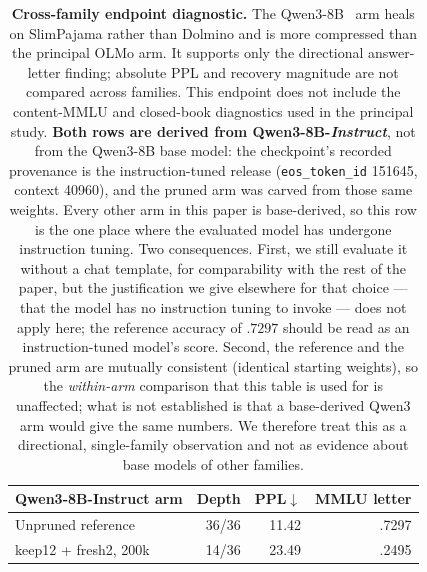 \begin{table}[t]
\centering
\small
\setlength{\tabcolsep}{4pt}
\begin{tabular}{@{}lrrr@{}}
\toprule
\textbf{Qwen3-8B-Instruct arm} & \textbf{Depth} & \textbf{PPL}$\downarrow$ & \textbf{MMLU letter} \\
\midrule
Unpruned reference & 36/36 & 11.42 & .7297 \\
keep12 + fresh2, 200k & 14/36 & 23.49 & .2495 \\
\bottomrule
\end{tabular}
\caption{\textbf{Cross-family endpoint diagnostic.} The Qwen3-8B~\citep{qwen3} arm heals on
SlimPajama rather than Dolmino and is more compressed than the principal OLMo
arm. It supports only the directional answer-letter finding; absolute PPL and
recovery magnitude are not compared across families. This endpoint does not
include the content-MMLU and closed-book diagnostics used in the principal study.
\textbf{Both rows are derived from Qwen3-8B-\emph{Instruct}}, not from the Qwen3-8B
base model: the checkpoint's recorded provenance is the instruction-tuned release
(\texttt{eos\_token\_id} 151645, context 40960), and the pruned arm was carved from
those same weights. Every other arm in this paper is base-derived, so this row is
the one place where the evaluated model has undergone instruction tuning. Two
consequences. First, we still evaluate it without a chat template, for
comparability with the rest of the paper, but the justification we give elsewhere
for that choice --- that the model has no instruction tuning to invoke --- does not
apply here; the reference accuracy of $.7297$ should be read as an
instruction-tuned model's score. Second, the reference and the pruned arm are
mutually consistent (identical starting weights), so the \emph{within-arm}
comparison that this table is used for is unaffected; what is not established is
that a base-derived Qwen3 arm would give the same numbers. We therefore treat this
as a directional, single-family observation and not as evidence about base models
of other families.}
\label{tab:app-crossfamily}
\end{table}
